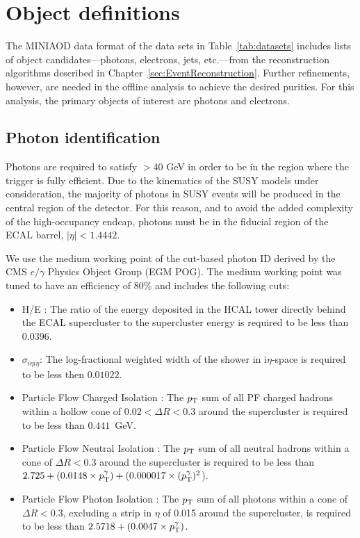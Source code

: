 \section{Object definitions}
\label{sec:ObjSelect}

The MINIAOD data format of the data sets in Table~\ref{tab:datasets} includes lists of object candidates---photons, electrons, jets, etc.---from the reconstruction algorithms described in Chapter~\ref{sec:EventReconstruction}. Further refinements, however, are needed in the offline analysis to achieve the desired purities. For this analysis, the primary objects of interest are photons and electrons.

\subsection{Photon identification}
\label{sec:phoID}
Photons are required to satisfy \pT $> 40$ GeV in order to be in the region where the trigger is fully efficient. Due to the kinematics of the SUSY models under consideration, the majority of photons in SUSY events will be produced in the central region of the detector. For this reason, and to avoid the added complexity of the high-occupancy endcap, photons must be in the fiducial region of the ECAL barrel, $|\eta| < 1.4442$. 

We use the medium working point of the cut-based photon ID derived by the CMS $e/\gamma$ Physics Object Group (EGM POG). The medium working point was tuned to have an efficiency of 80\% and includes the following cuts:

\begin{itemize}[leftmargin=*]
\item { H/E :} The ratio of the energy deposited in the HCAL tower directly behind the ECAL supercluster to the supercluster energy is required to be less than $0.0396$.
\item {$\sigma_{i{\eta}i{\eta}}$:} The log-fractional weighted width of the shower in i{$\eta$}-space is required to be less then $0.01022$.
\item {Particle Flow Charged Isolation :} The $p_{\mathrm{T}}$ sum of all PF charged hadrons within a hollow cone of $0.02 < \Delta R < 0.3$ around the supercluster is required to be less than $0.441$~GeV.
\item {Particle Flow Neutral Isolation :} The $p_{\mathrm{T}}$ sum of all neutral hadrons within a cone of $\Delta R <0.3$ around the supercluster
                                              is required to be less than $2.725 + (0.0148 \times p_{\mathrm{T}}^{\gamma}) + (0.000017 \times (p_{\mathrm{T}}^{\gamma})^2$).
\item {Particle Flow Photon Isolation :} The $p_{\mathrm{T}}$ sum of all photons within a cone of $\Delta R < 0.3$,
                                             excluding a strip in $\eta$ of 0.015 around the supercluster, is required to be less than $2.5718 + (0.0047 \times p_{\mathrm{T}}^{\gamma})$.
\end{itemize}


